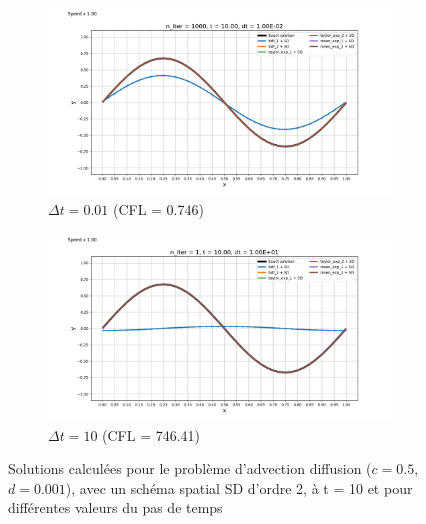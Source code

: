         \begin{figure}
            \centering
            \begin{subfigure}{.5\textwidth}
                \centering
                \includegraphics[width=\textwidth]{images/resultats/edp_adv_diff_cfl_1.png}
                \caption{$\Delta t = 0.01$ (CFL = 0.746)}
                \label{fig:edp_adv_diff_cfl_1}
            \end{subfigure}%
            \begin{subfigure}{.5\textwidth}
                \centering
                \includegraphics[width=\textwidth]{images/resultats/edp_adv_diff_cfl_2.png}
                \caption{$\Delta t = 10$ (CFL = 746.41)}
                \label{fig:edp_adv_diff_cfl_2}
            \end{subfigure}
            \caption{Solutions calculées pour le problème d'advection diffusion ($c = 0.5$, $d = 0.001$), avec un schéma spatial SD d'ordre 2, à t = 10 et pour différentes valeurs du pas de temps}
            \label{fig:edp_adv_diff_cfl}
        \end{figure}

